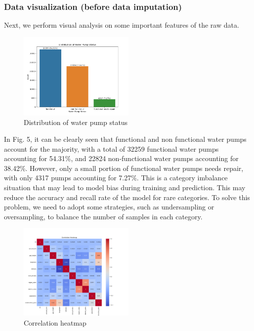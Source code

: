 \documentclass[conference]{IEEEtran}
\begin{document}
\subsubsection{Data visualization (before data imputation)}

Next, we perform visual analysis on some important features of the raw data.

\begin{figure}[H]
\centerline{\includegraphics[width=0.5\textwidth]{4.pic.jpg}}
\caption{Distribution of water pump status}
\end{figure}

In Fig. 5, it can be clearly seen that functional and non functional water pumps account for the majority, with a total of 32259 functional water pumps accounting for 54.31\%, and 22824 non-functional water pumps accounting for 38.42\%. However, only a small portion of functional water pumps needs repair, with only 4317 pumps accounting for 7.27\%. This is a category imbalance situation that may lead to model bias during training and prediction. This may reduce the accuracy and recall rate of the model for rare categories. To solve this problem, we need to adopt some strategies, such as undersampling or oversampling, to balance the number of samples in each category.

\begin{figure}[H]
\centerline{\includegraphics[width=0.5\textwidth]{5.pic.jpg}}
\caption{Correlation heatmap}
\end{figure}
\end{document}
